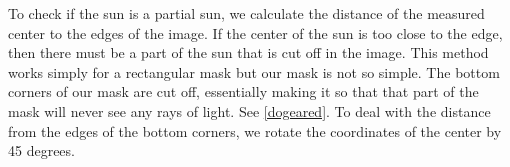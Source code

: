 \documentclass[10pt]{scrartcl}
\begin{document}
To check if the sun is a partial sun, we calculate the distance of the measured center to the edges of the image. If the center of the sun is too close to the edge, then there must be a part of the sun that is cut off in the image. This method works simply for a rectangular mask but our mask is not so simple. The bottom corners of our mask are cut off, essentially making it so that that part of the mask will never see any rays of light. See \cref{dogeared}. To deal with the distance from the edges of the bottom corners, we rotate the coordinates of the center by 45 degrees. 

\begin{figure}[!ht]
\end{figure}
\end{document}
